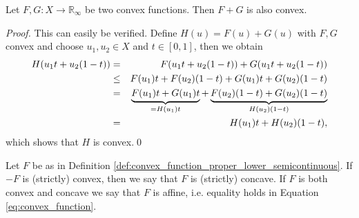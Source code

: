     \begin{proposition} %
        
        Let $F, G: X \longrightarrow \mathbb{R}_{\infty}$ be two convex functions. Then $F + G$ is also convex.

    \end{proposition}

    \begin{proof} %
        This can easily be verified. Define $H(u) = F(u) + G(u)$ with $F, G$ convex and choose $u_{1}, u_{2} \in X$ and $t \in [0, 1]$, then we obtain
        \begin{eqnarray}
            H(u_{1}t + u_{2}(1 - t)) &=& F(u_{1}t + u_{2}(1 - t)) + G(u_{1}t + u_{2}(1 - t)) \notag \\ 
            &\le& F(u_{1})t + F(u_{2})(1 - t) + G(u_{1})t + G(u_{2})(1 - t) \notag \\
            &=& \underbrace{F(u_{1})t + G(u_{1})t}_{= H(u_{1})t} + \underbrace{F(u_{2})(1 - t) + G(u_{2})(1 - t)}_{H(u_{2})(1 - t)} \notag \\
            &=& H(u_{1})t + H(u_{2})(1 - t), \notag
        \end{eqnarray}
        which shows that $H$ is convex.\qed
    \end{proof}

    \begin{remark} %
        \label{rem:concave_function}

        Let $F$ be as in Definition \ref{def:convex_function_proper_lower_semicontinuous}. If $-F$ is (strictly) convex, then we say that $F$ is (strictly) concave. If $F$ is both convex and concave we say that $F$ is affine, i.e. equality holds in Equation \ref{eq:convex_function}.

    \end{remark}

